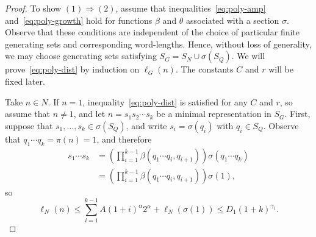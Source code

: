 \documentclass{amsart}
\theoremstyle{definition}
\theoremstyle{remark}
\begin{document}
\begin{proof}
  To show $(1){\Rightarrow} (2)$, assume that inequalities~\eqref{eq:poly-amp}
  and~\eqref{eq:poly-growth} hold for functions $\beta$ and $\theta$
  associated with a section $\sigma$. Observe that these conditions
  are independent of the choice of particular finite generating sets
  and corresponding word-lengths. Hence, without loss of generality,
  we may choose generating sets satisfying
  $S_G=S_N\cup\sigma(S_Q)$. We will prove~\eqref{eq:poly-dist} by
  induction on $\ell_G(n)$. The constants $C$ and $r$ will be fixed
  later.
  
  Take $n\in N$. If $n=1$, inequality~\eqref{eq:poly-dist} is
  satisfied for any $C$ and $r$, so assume that $n\ne 1$, and let
  $n=s_1s_2\cdots s_k$ be a minimal representation in $S_G$. First,
  suppose that $s_1,\dots,s_k\in \sigma(S_Q)$, and write
  $s_i=\sigma(q_i)$ with $q_i\in S_Q$. Observe that $q_1\cdots q_k=\pi(n)=1$, and therefore
  \begin{equation}
    \label{eq:polydist-proof-3}
    \begin{split}
      s_1\cdots s_k & = \left(\prod_{i=1}^{k-1} \beta(q_1\cdots q_i,
        q_{i+1})\right) \sigma(q_1\cdots q_k) \\
      & =\left(\prod_{i=1}^{k-1}
        \beta(q_1\cdots q_i, q_{i+1})\right) \sigma(1),
    \end{split}
  \end{equation}
  so 
  \begin{equation}
    \label{eq:eq-polydist-proof-3a}
    \ell_N(n)\leq \sum_{i=1}^{k-1} A(1+i)^\alpha 2^\alpha +\ell_N(\sigma(1)) \leq D_1(1+k)^{\gamma_1}.
  \end{equation}


\end{proof}
\end{document}
